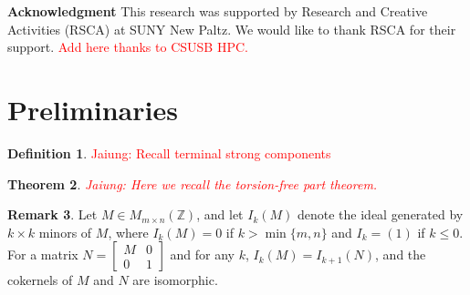 \documentclass[11pt,reqno]{amsart}
\DeclareMathOperator{\Pic}{Pic}
\DeclareMathOperator{\Jac}{Jac}
\theoremstyle{definition}
\newtheorem{mydef}{Definition}[section]
\newtheorem{rmk}[mydef]{Remark}
\theoremstyle{plain}
\newtheorem{mytheorem}[mydef]{Theorem}
\begin{document}


\bigskip


\textbf{Acknowledgment}\hspace{0.1cm} This research was supported by Research and Creative Activities (RSCA) at SUNY New Paltz. We would like to thank RSCA for their support. \textcolor{red}{Add here thanks to CSUSB HPC.}

\section{Preliminaries}

\begin{mydef}
	\textcolor{red}{Jaiung: Recall terminal strong components}
\end{mydef}

\begin{mytheorem}
\textcolor{red}{Jaiung: Here we recall \cite{wagner2000critical} the torsion-free part theorem. }
\end{mytheorem}

		\begin{rmk}\label{remark: embedding}
	Let $M \in M_{m \times n}(\mathbb{Z})$, 
	and let $I_k(M)$ denote the ideal generated by $k \times k$ minors of $M$, 
	where $I_k(M) = 0$ if $k > \min\{m,n\}$ and $I_k = (1)$ if $k \le 0$. 
	For a matrix $N = \left[ \begin{array}{c|c}
		M & 0 \\
		\hline
		0 & 1
	\end{array} \right]$ and for any $k$, $I_k(M) = I_{k+1}(N)$, and the cokernels of $M$ and $N$ are isomorphic. 
\end{rmk}
\end{document}
